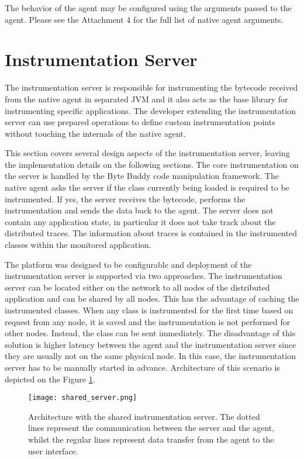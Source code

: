 The behavior of the agent may be configured using the arguments passed to the agent. Please see the Attachment 4 for the full list of native agent arguments.

\section{Instrumentation Server}
\label{sec:inst_server}
The instrumentation server is responsible for instrumenting the bytecode received from the native agent in separated JVM and it also acts as the base library for instrumenting specific applications. The developer extending the instrumentation server can use prepared operations to define custom instrumentation points without touching the internals of the native agent.

This section covers several design aspects of the instrumentation server, leaving the implementation details on the following sections. The core instrumentation on the server is handled by the Byte Buddy code manipulation framework. The native agent asks the server if the class currently being loaded is required to be instrumented. If yes, the server receives the bytecode, performs the instrumentation and sends the data back to the agent. The server does not contain any application state, in particular it does not take track about the distributed traces. The information about traces is contained in the instrumented classes within the monitored application.

The platform was designed to be configurable and deployment of the instrumentation server is supported via two approaches. The instrumentation server can be located either on the network to all nodes of the distributed application and can be shared by all nodes. This has the advantage of caching the instrumented classes. When any class is instrumented for the first time based on request from any node, it is saved and the instrumentation is not performed for other nodes. Instead, the class can be sent immediately. The disadvantage of this solution is higher latency between the agent and the instrumentation server since they are usually not on the same physical node. In this case, the instrumentation server has to be manually started in advance. Architecture of this scenario is depicted on the Figure \ref{fig:shared_server}.
 
 \begin{figure}
 	\centering
 	\texttt{[image: shared\_server.png]}
 	\caption{Architecture with the shared instrumentation server. The dotted lines represent the communication between the server and the agent, whilst the regular lines represent data transfer from the agent to the user interface.}
 	\label{fig:shared_server}
 \end{figure}
 
